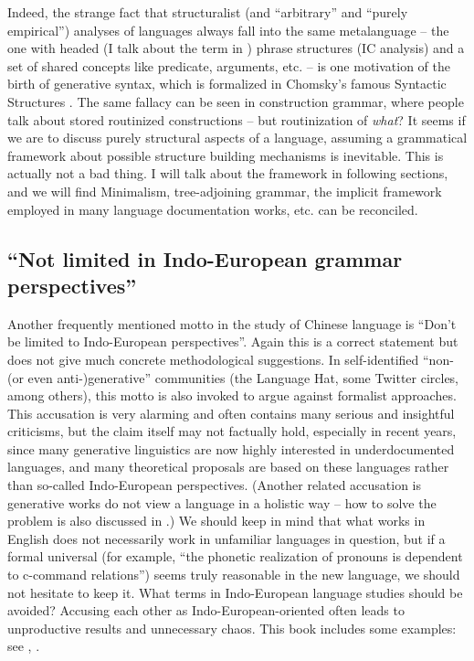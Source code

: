 \documentclass[../main.tex]{subfiles}
\begin{document}
Indeed, the strange fact that structuralist (and ``arbitrary'' and ``purely empirical'') analyses of 
languages always fall into the same metalanguage -- the one with headed (I talk about the term in 
) phrase structures (IC analysis) and a set of shared concepts like predicate, 
arguments, etc. -- is one motivation of the birth of generative syntax, which is formalized in Chomsky's 
famous Syntactic Structures \citep{chomsky2009syntactic}. The same fallacy can be seen in construction grammar,
where people talk about stored routinized constructions -- but routinization of \emph{what}? 
It seems if we are to discuss purely structural aspects of a language, assuming a grammatical framework 
about possible structure building mechanisms is inevitable. This is actually not a bad thing. I will 
talk about the framework in following sections, and we will find Minimalism, tree-adjoining
grammar, the implicit framework employed in many language documentation works, etc. can be reconciled.

\subsection{``Not limited in Indo-European grammar perspectives''}

Another frequently mentioned motto in the study of Chinese language is ``Don't be limited to Indo-European
perspectives''. Again this is a correct statement but does not give much concrete methodological suggestions.
In self-identified ``non-(or even anti-)generative'' communities (the Language Hat, some Twitter circles, 
among others), this motto is also invoked to argue against formalist approaches. This accusation is very alarming and often contains many serious and insightful criticisms, but the claim itself may not factually 
hold, especially in recent years, since many generative linguistics are now highly interested in
underdocumented languages, and many theoretical proposals \citep{preminger2014agreement} are based on %
these languages rather than so-called Indo-European perspectives. (Another related accusation is 
generative works do not view a language in a holistic way -- how to solve the problem is also 
discussed in .) We should keep in mind 
that what works in English does not necessarily work in unfamiliar languages in question, but if 
a formal universal (for example, ``the phonetic realization of pronouns is dependent to c-command relations'')
seems truly reasonable in the new language, we should not hesitate to keep it.
What terms in Indo-European language studies should be avoided? Accusing each other as Indo-European-oriented 
often leads to unproductive results and unnecessary chaos. This book includes some examples: 
see , . %
\end{document}
